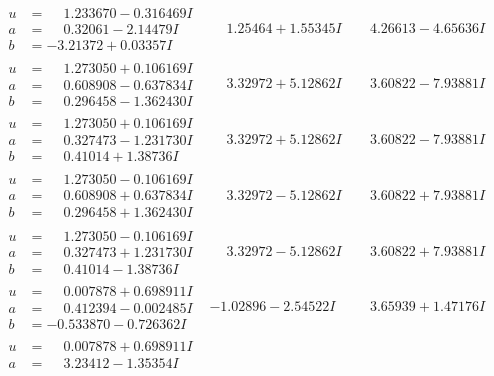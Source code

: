 \documentclass[1p]{elsarticle_modified}
\theoremstyle{definition}
\begin{document}
$$\begin{array}{c|c|c}
\begin{aligned}
u &= \phantom{-}1.233670 - 0.316469 I \\
a &= \phantom{-}0.32061 - 2.14479 I \\
b &= -3.21372 + 0.03357 I\end{aligned}
 & \phantom{-}1.25464 + 1.55345 I & \phantom{-}4.26613 - 4.65636 I \\ \hline\begin{aligned}
u &= \phantom{-}1.273050 + 0.106169 I \\
a &= \phantom{-}0.608908 - 0.637834 I \\
b &= \phantom{-}0.296458 - 1.362430 I\end{aligned}
 & \phantom{-}3.32972 + 5.12862 I & \phantom{-}3.60822 - 7.93881 I \\ \hline\begin{aligned}
u &= \phantom{-}1.273050 + 0.106169 I \\
a &= \phantom{-}0.327473 - 1.231730 I \\
b &= \phantom{-}0.41014 + 1.38736 I\end{aligned}
 & \phantom{-}3.32972 + 5.12862 I & \phantom{-}3.60822 - 7.93881 I \\ \hline\begin{aligned}
u &= \phantom{-}1.273050 - 0.106169 I \\
a &= \phantom{-}0.608908 + 0.637834 I \\
b &= \phantom{-}0.296458 + 1.362430 I\end{aligned}
 & \phantom{-}3.32972 - 5.12862 I & \phantom{-}3.60822 + 7.93881 I \\ \hline\begin{aligned}
u &= \phantom{-}1.273050 - 0.106169 I \\
a &= \phantom{-}0.327473 + 1.231730 I \\
b &= \phantom{-}0.41014 - 1.38736 I\end{aligned}
 & \phantom{-}3.32972 - 5.12862 I & \phantom{-}3.60822 + 7.93881 I \\ \hline\begin{aligned}
u &= \phantom{-}0.007878 + 0.698911 I \\
a &= \phantom{-}0.412394 - 0.002485 I \\
b &= -0.533870 - 0.726362 I\end{aligned}
 & -1.02896 - 2.54522 I & \phantom{-}3.65939 + 1.47176 I \\ \hline\begin{aligned}
u &= \phantom{-}0.007878 + 0.698911 I \\
a &= \phantom{-}3.23412 - 1.35354 I \\

\end{aligned}
\end{array}$$
\end{document}
